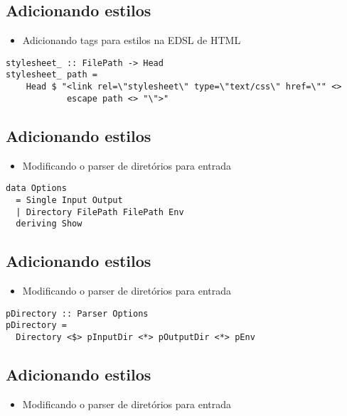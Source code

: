 \documentclass[11pt]{article}
\begin{document}
\subsection*{Adicionando estilos}
\label{sec:org4eb7be8}

\begin{itemize}
\item Adicionando tags para estilos na EDSL de HTML
\end{itemize}

\begin{verbatim}
stylesheet_ :: FilePath -> Head
stylesheet_ path =
    Head $ "<link rel=\"stylesheet\" type=\"text/css\" href=\"" <>
            escape path <> "\">"
\end{verbatim}
\subsection*{Adicionando estilos}
\label{sec:orgf81373c}

\begin{itemize}
\item Modificando o parser de diretórios para entrada
\end{itemize}

\begin{verbatim}
data Options
  = Single Input Output
  | Directory FilePath FilePath Env 
  deriving Show
\end{verbatim}
\subsection*{Adicionando estilos}
\label{sec:org230c5b9}

\begin{itemize}
\item Modificando o parser de diretórios para entrada
\end{itemize}

\begin{verbatim}
pDirectory :: Parser Options
pDirectory =
  Directory <$> pInputDir <*> pOutputDir <*> pEnv
\end{verbatim}
\subsection*{Adicionando estilos}
\label{sec:org99c329b}

\begin{itemize}
\item Modificando o parser de diretórios para entrada
\end{itemize}
\end{document}
